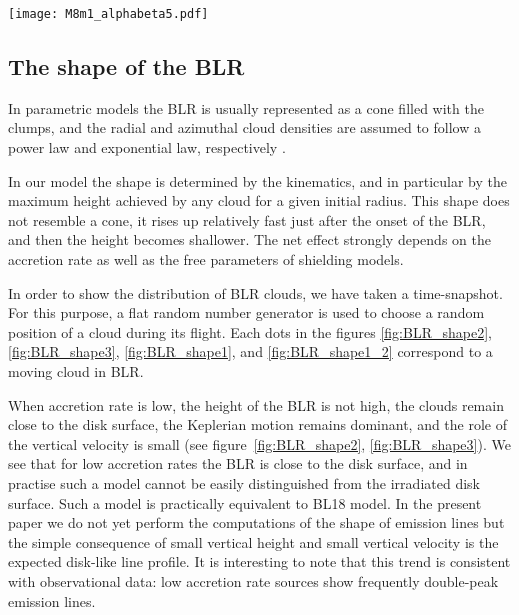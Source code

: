 \documentclass[twocolumn]{aastex62}
\begin{document}
\begin{figure*}[hbp]
	\centering
	\texttt{[image: M8m1\_alphabeta5.pdf]}
	\caption{The shape of the BLR calculated from FRADO model for $\dot m = 1$ in the form of a time-snapshot. Upper panels: $\alpha$-patch model of $\alpha =5$. Lower panels: $\beta$-patch model of $\beta =5$. Right panels are the zoom-out version of left panels in order to show the extension of stream up to torus. The black dotted line represents the disk surface. Escaping clouds are represented by asterisks, and the area covered by escaping clouds is confined within two blue dashed lines.}
	\label{fig:BLR_shape1_2}
\end{figure*}

\subsection{The shape of the BLR}

In parametric models the BLR is usually represented as a cone filled with the clumps, and the radial and azimuthal cloud densities are assumed to follow a power law and exponential law, respectively \citep{Netzer1993, Ward2014, tek2016, Tek2018,GravityColl2018}.

In our model the shape is determined by the kinematics, and in particular by the maximum height achieved by any cloud for a given initial radius. This shape does not resemble a cone, it rises up relatively fast just after the onset of the BLR, and then the height becomes shallower. The net effect strongly depends on the accretion rate as well as the free parameters of shielding models.

In order to show the distribution of BLR clouds, we have taken a time-snapshot. For this purpose, a flat random number generator is used to choose a random position of a cloud during its flight. Each dots in the figures \ref{fig:BLR_shape2}, \ref{fig:BLR_shape3}, \ref{fig:BLR_shape1}, and \ref{fig:BLR_shape1_2} correspond to a moving cloud in BLR.

When accretion rate is low, the height of the BLR is not high, the clouds remain close to the disk surface, the Keplerian motion remains dominant, and the role of the vertical velocity is small (see figure~\ref{fig:BLR_shape2}, \ref{fig:BLR_shape3}). We see that for low accretion rates the BLR is close to the disk surface, and in practise such a model cannot be easily distinguished from the irradiated disk surface. Such a model is practically equivalent to BL18 model. In the present paper we do not yet perform the computations of the shape of emission lines but the simple consequence of small vertical height and small vertical velocity is the expected disk-like line profile. It is interesting to note that this trend is consistent with observational data: low accretion rate sources show frequently double-peak emission lines.
\end{document}
